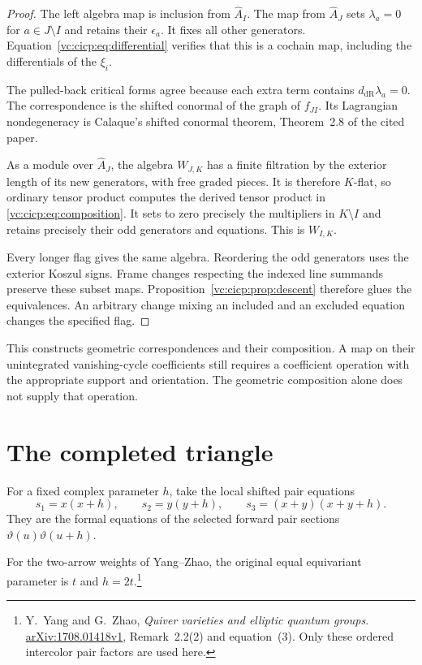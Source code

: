 \begin{proof}
The left algebra map is inclusion from $\widehat A_I$.
The map from $\widehat A_J$ sets
$\lambda_a=0$ for $a\in J\setminus I$ and retains their
$\epsilon_a$. It fixes all other generators.
Equation~\eqref{vc:cicp:eq:differential} verifies that this is a
cochain map, including the differentials of the $\xi_i$.

The pulled-back critical forms agree because each extra
term contains $d_{\mathrm{dR}}\lambda_a=0$.
The correspondence is the shifted conormal of the graph of
$f_{JI}$. Its Lagrangian nondegeneracy is Calaque's shifted
conormal theorem, Theorem~2.8 of the cited paper.

As a module over $\widehat A_J$, the algebra $W_{J,K}$ has
a finite filtration by the exterior length of its new
generators, with free graded pieces. It is therefore
$K$-flat, so ordinary tensor product computes the derived
tensor product in \eqref{vc:cicp:eq:composition}.
It sets to zero precisely the multipliers in $K\setminus I$
and retains precisely their odd generators and equations.
This is $W_{I,K}$.

Every longer flag gives the same algebra.
Reordering the odd generators uses the exterior Koszul signs.
Frame changes respecting the indexed line summands preserve
these subset maps. Proposition~\ref{vc:cicp:prop:descent}
therefore glues the equivalences. An arbitrary change mixing
an included and an excluded equation changes the specified flag.
\end{proof}

This constructs geometric correspondences and their composition.
A map on their unintegrated vanishing-cycle coefficients still
requires a coefficient operation with the appropriate support
and orientation. The geometric composition alone does not
supply that operation.

\section{The completed triangle}

For a fixed complex parameter $h$, take the local shifted pair equations
\[
 s_1=x(x+h),\qquad s_2=y(y+h),\qquad
 s_3=(x+y)(x+y+h).
\]
They are the formal equations of the selected forward pair
sections $\vartheta(u)\vartheta(u+h)$.

For the two-arrow weights of Yang--Zhao, the original equal
equivariant parameter is $t$ and $h=2t$.\footnote{
Y.~Yang and G.~Zhao, \emph{Quiver varieties and elliptic
quantum groups}.
\href{https://arxiv.org/abs/1708.01418v1}{arXiv:1708.01418v1},
Remark~2.2(2) and equation~(3). Only these ordered intercolor
pair factors are used here.}

